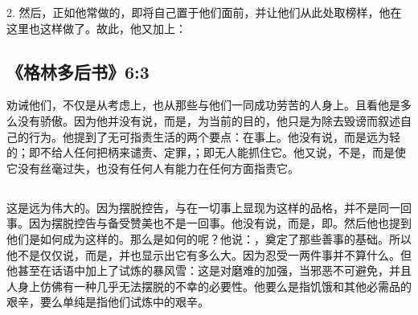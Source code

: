 2. 然后，正如他常做的，即将自己置于他们面前，并让他们从此处取榜样，他在这里也这样做了。故此，他又加上：\par


\subsection{《格林多后书》6:3}

劝诫他们，不仅是从考虑上，也从那些与他们一同成功劳苦的人身上。且看他是多么没有骄傲。因为他并没有说，而是，为当前的目的，他只是为除去毁谤而叙述自己的行为。他提到了无可指责生活的两个要点：在事上。他没有说，而是远为轻的；即不给人任何把柄来谴责、定罪，；即无人能抓住它。他又说，不是，而是使它没有丝毫过失，也没有任何人有能力在任何方面指责它。\par


\subsection{}

\par

这是远为伟大的。因为摆脱控告，与在一切事上显现为这样的品格，并不是同一回事。因为摆脱控告与备受赞美也不是一回事。他没有说，而是，即。然后他也提到他们是如何成为这样的。那么是如何的呢？他说：，奠定了那些善事的基础。所以他不是仅仅说，而是，并也显示出它有多么大。因为忍受一两件事并不算什么。但他甚至在话语中加上了试炼的暴风雪：这是对磨难的加强，当邪恶不可避免，并且人身上仿佛有一种几乎无法摆脱的不幸的必要性。他要么是指饥饿和其他必需品的艰辛，要么单纯是指他们试炼中的艰辛。\par


\subsection{}

